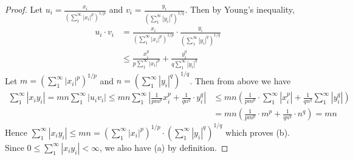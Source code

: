 \begin{proof}
    Let $u_i=\frac{x_i}{\left(\sum_{1}^{\infty}
    {|x_i|^{p}}\right)^{1/p}}$ and 
    $v_i=\frac{y_i}{\left(\sum_{1}^{\infty}
    {|y_i|^{q}}\right)^{1/q}}$. Then by Young's inequality,
    \begin{align*}
        u_{i}\cdot v_{i} &= \frac{x_i}{
            \left(\sum_{1}^{\infty}
            {|x_i|^{p}}\right)^{1/p}
            }
            \cdot \frac{y_i}{\left(\sum_{1}^{\infty}
            {|y_i|^{q}}\right)^{1/q}}\\
            &\leq \frac{x_i^p}{
            p\sum_{1}^{\infty}
            {|x_i|^{p}}
            } +
            \frac{y_i^q}{q\sum_{1}^{\infty}
            {|y_i|^{q}}}
    \end{align*}
    Let $m = \left(\sum_{1}^{\infty}{|x_i|^{p}}\right)^{1/p}$
    and $n = \left(\sum_{1}^{\infty}{|y_i|^{q}}\right)^{1/q}$.
    Then from above we have
    \begin{align*}
        \sum_{1}^{\infty}{|x_{i}y_{i}|} = 
    mn\sum_{1}^{\infty}{|u_{i}v_{i}|} \leq
    mn\sum_1^\infty{\left|\frac{1}{pm^p}x_i^p +
    \frac{1}{qn^q}\cdot y_i^q\right|}&\leq mn\left(\frac{1}{pm^p}
    \cdot\sum_1^\infty\left|x_i^p\right|+\frac{1}{qn^q}
    \sum_1^\infty\left|y_i^q\right|\right)\\
    &=mn\left(\frac{1}{pm^p}\cdot m^p +\frac{1}{qn^q}\cdot n^q
    \right) = mn
    \end{align*}
    Hence $\sum_{1}^{\infty}{|x_{i}y_{i}|}\leq mn = 
    \left(\sum_{1}^{\infty}{|x_i|^{p}}\right)^{1/p}\cdot
    \left(\sum_{1}^{\infty}{|y_i|^{q}}\right)^{1/q}$ which proves
    (b). Since $0\leq\sum_{1}^{\infty}{|x_{i}y_{i}|}<\infty$, we also
    have (a) by definition.
\end{proof}